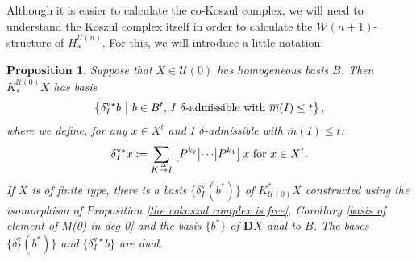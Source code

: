 \documentclass[11pt]{amsart} \renewcommand{\baselinestretch}{1.2}
\theoremstyle{plain}
\newtheorem{prop}[thm]{Proposition}
\numberwithin{equation}{section} %
\theoremstyle{plain}
\newtheorem{prop}[thm]{Proposition}
\numberwithin{equation}{chapter} %
\newcommand{\calU}{\mathcal{U}}
\newcommand{\calw}{\mathcal{W}}
\newcommand{\deltaalg}{\Delta} %
\newcommand{\minDimP}{\overline{m}}
\newcommand{\produces}[3]{#3:#1\sim #2}
\renewcommand{\produces}[3]{#1\rightarrow_{#3} #2}%
\renewcommand{\produces}[3]{#1\overset{\smash{#3}}{\rightarrow} #2}%
\newcommand{\uver}{^\mathrm{v}}
\newcommand{\deltav}{\delta\uver}
\newcommand{\deltavstar}{\delta^{\mathrm{v}\star}}
\newcommand{\dual}{\mathbf{D}}
\newcommand{\SubsectionOrSection}[1]{\subsection{#1}}
\begin{document}
\begin{Koszul complexes}
Although it is easier to calculate the co-Koszul complex, we will need to understand the Koszul complex itself in order to calculate the $\calw(n+1)$-structure of $H_*^{\calU(n)}$. For this, we will introduce a little notation:
\begin{prop}
\label{propDerivedIndTrivialUobject n=0}
Suppose that $X\in\calU(0)$ has homogeneous basis $B$. Then $K_*^{\calU(0)}X$ has basis
\[\left\{\deltavstar_Ib\ \middle|\ b\in B^t\textup{, $I$ $\delta$-admissible with }\minDimP(I)\leq t\right\},\]
where we define, for any $x \in X^t$ and $I$ $\delta$-admissible with $\minDimP(I)\leq t$:
\[\deltavstar_Ix:=
\sum_{\produces{K}{I}{\deltaalg}}\left[P^{k_\ell} \middle|\cdots\middle|P^{k_1} \right]x\textup{ for $x\in X^t$}.\]
%
If $X$ is of finite type, there is a basis $\{\deltav_I(b^*)\}$ of $K^*_{\calU(0)}X$ constructed using the isomorphism of Proposition \ref{the cokoszul complex is free}, Corollary \ref{basis of element of M(0) in deg 0} and the basis $\{b^*\}$ of $\dual X$ dual to $B$. The bases $\{\deltav_I(b^*)\}$ and $\{\deltavstar_Ib\}$ are dual.


\end{prop}
\end{Koszul complexes}
\end{document}
